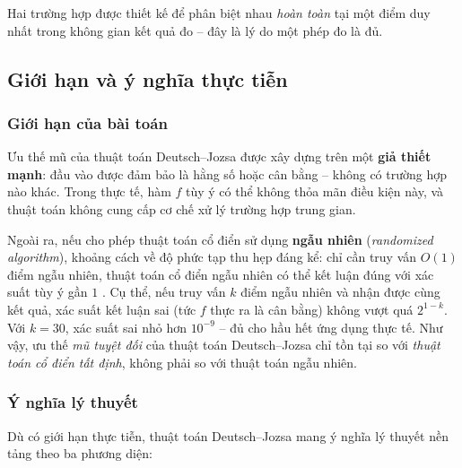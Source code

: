 Hai trường hợp được thiết kế để phân biệt nhau \emph{hoàn toàn} tại một điểm
duy nhất trong không gian kết quả đo -- đây là lý do một phép đo là đủ.
 
\subsection*{Giới hạn và ý nghĩa thực tiễn}
 
\subsubsection*{Giới hạn của bài toán}
 
Ưu thế mũ của thuật toán Deutsch--Jozsa được xây dựng trên một \textbf{giả
thiết mạnh}: đầu vào được đảm bảo là hằng số hoặc cân bằng -- không có trường
hợp nào khác. Trong thực tế, hàm $f$ tùy ý có thể không thỏa mãn điều kiện
này, và thuật toán không cung cấp cơ chế xử lý trường hợp trung gian.
 
Ngoài ra, nếu cho phép thuật toán cổ điển sử dụng \textbf{ngẫu nhiên}
(\textit{randomized algorithm}), khoảng cách về độ phức tạp thu hẹp đáng kể:
chỉ cần truy vấn $O(1)$ điểm ngẫu nhiên, thuật toán cổ điển ngẫu nhiên có thể
kết luận đúng với xác suất tùy ý gần $1$ \cite{ref5}. Cụ thể, nếu truy vấn $k$
điểm ngẫu nhiên và nhận được cùng kết quả, xác suất kết luận sai (tức $f$ thực
ra là cân bằng) không vượt quá $2^{1-k}$. Với $k = 30$, xác suất sai nhỏ hơn
$10^{-9}$ -- đủ cho hầu hết ứng dụng thực tế. Như vậy, ưu thế \emph{mũ tuyệt
đối} của thuật toán Deutsch--Jozsa chỉ tồn tại so với \emph{thuật toán cổ điển
tất định}, không phải so với thuật toán ngẫu nhiên.
 
\subsubsection*{Ý nghĩa lý thuyết}
 
Dù có giới hạn thực tiễn, thuật toán Deutsch--Jozsa mang ý nghĩa lý thuyết nền
tảng theo ba phương diện:
 
